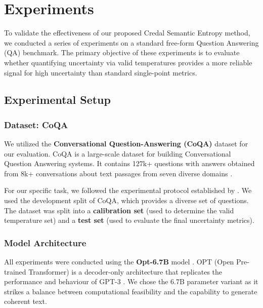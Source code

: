 %
\chapter{Experiments}
\label{sec:experiments}
To validate the effectiveness of our proposed Credal Semantic
Entropy method, we conducted a series of experiments on a 
standard free-form Question Answering (QA) benchmark.
The primary objective of these experiments is to evaluate
whether quantifying uncertainty via valid 
temperatures provides a more reliable signal for high uncertainty 
than standard single-point metrics.


\section{Experimental Setup}
\label{sec:experiments:setup}

\subsection{Dataset: CoQA}
\label{sec:experiments:setup:coqa}
We utilized the \textbf{Conversational Question-Answering (CoQA)} 
dataset \parencite{reddy2019coqaconversationalquestionanswering}
for our evaluation. CoQA is a large-scale dataset for building
Conversational Question Answering systems. It contains 127k+ 
questions with answers obtained from 8k+ conversations about 
text passages from seven diverse domains 
\parencite{reddy2019coqaconversationalquestionanswering}.

For our specific task, we followed the 
experimental protocol established by 
\textcite{kuhn2023semanticuncertaintylinguisticinvariances}.
We used the development split of CoQA, which provides a diverse 
set of questions. The dataset was split into a \textbf{calibration set} 
(used to determine the valid temperature set) and a \textbf{test set}
(used to evaluate the final uncertainty metrics).


\subsection{Model Architecture}
\label{sec:experiments:setup:model}
All experiments were conducted using the \textbf{Opt-6.7B} model
\parencite{zhang2022opt}. OPT (Open Pre-trained Transformer) is a 
decoder-only architecture that replicates the performance and 
behaviour of GPT-3 \parencite{brown2020languagemodelsfewshotlearners}.
We chose the 6.7B parameter variant as it strikes a balance between
computational feasibility and the capability to generate coherent text.

